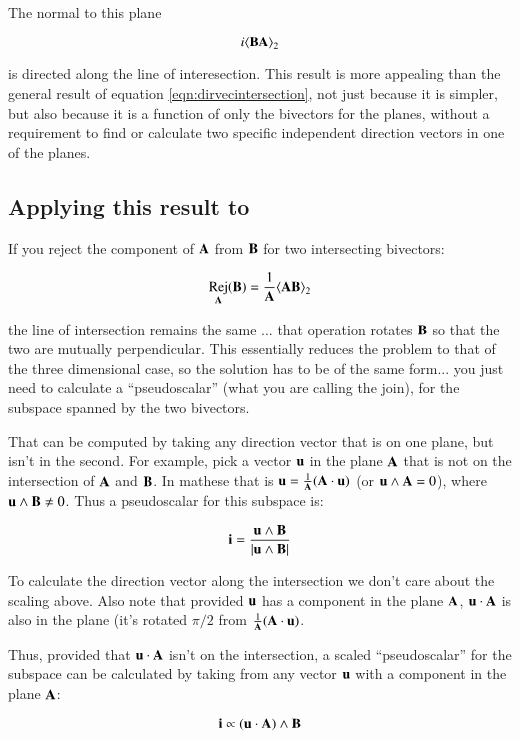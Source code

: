 \documentclass{article}      %
\DeclareMathOperator{\Rej}{Rej}
\newcommand{\gpgrade}[2] {{\left\langle{{#1}}\right\rangle}_{#2}}
\newcommand{\gpgradetwo}[1] {\gpgrade{#1}{2}}
\begin{document}
The normal to this plane

\begin{equation}\label{eqn:r3planeintersect}
i\gpgradetwo{\BB\BA}
\end{equation}

is directed along the line of interesection.  This result is more appealing than
the general  result of equation \ref{eqn:dirvecintersection}, not
just because it is simpler, but also because it is a function of only the
bivectors for the planes, without a requirement to find or calculate
two specific independent direction vectors in one of the planes.

\subsection{ Applying this result to  }

If you reject the component of $\mathbf{A}$ from $\mathbf{B}$ for two intersecting bivectors:

\[
\Rej_{\BA}(\BB) = \frac{1}{\BA}\gpgradetwo{\BA\BB}
\]

the line of intersection remains the same ... that operation rotates $\mathbf{B}$ so that the two are mutually perpendicular.  This essentially reduces the problem to that of the three dimensional case, so the solution has to be of the same form... you just need to calculate a ``pseudoscalar'' (what you are calling the join), for the subspace spanned by the two bivectors.

That can be computed by taking any direction vector that is on one plane, but isn't in the second.  For example, pick a vector $\mathbf{u}$ in the plane $\mathbf{A}$ that is not on the intersection of $\mathbf{A}$ and $\mathbf{B}$.  In mathese that is $\mathbf{u} = \frac{1}{\mathbf{A}}(\mathbf{A}\cdot \mathbf{u})$ (or $\mathbf{u} \wedge \mathbf{A} = 0$), where $\mathbf{u} \wedge \mathbf{B} \ne 0$.  Thus a pseudoscalar for this subspace is:

\[
\mathbf{i} = \frac{\mathbf{u} \wedge \mathbf{B}}{\lvert{\mathbf{u}\wedge \mathbf{B}}\rvert}
\]

To calculate the direction vector along the intersection we don't care about the scaling above.  Also note that provided $\mathbf{u}$ has a component in the plane $\mathbf{A}$, $\mathbf{u} \cdot \mathbf{A}$ is also in the plane (it's rotated $\pi/2$ from $\frac{1}{\mathbf{A}}(\mathbf{A} \cdot \mathbf{u})$.

Thus, provided that $\mathbf{u} \cdot \mathbf{A}$ isn't on the intersection, a scaled ``pseudoscalar''
for the subspace can be calculated by taking from any vector $\mathbf{u}$ with a component in the plane $\mathbf{A}$:

\[
\mathbf{i} \propto (\mathbf{u} \cdot \mathbf{A}) \wedge \mathbf{B}
\]
\end{document}
